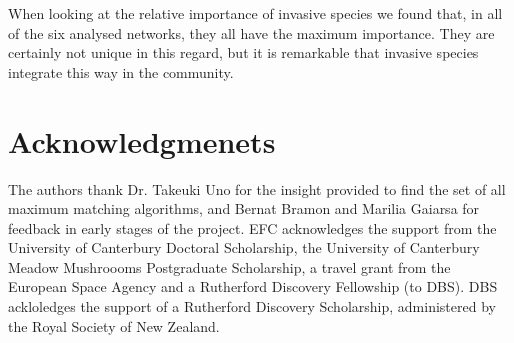 \documentclass[a4paper,10pt]{article}
\begin{document}
When looking at the relative importance of invasive species we found that, in all of the six analysed networks, they all have the maximum importance. They are certainly not unique in this regard, but it is remarkable that invasive species integrate this way in the community.

\section*{Acknowledgmenets}

The authors thank Dr. Takeuki Uno for the insight provided to find the set of all maximum matching algorithms, and Bernat Bramon and Marilia Gaiarsa for feedback in early stages of the project. EFC acknowledges the support from the University of Canterbury Doctoral Scholarship, the University of Canterbury Meadow Mushroooms Postgraduate Scholarship, a travel grant from the European Space Agency and a Rutherford Discovery Fellowship (to DBS). DBS ackloledges the support of a Rutherford Discovery Scholarship, administered by the Royal Society of New Zealand.

\printbibliography
\end{document}

